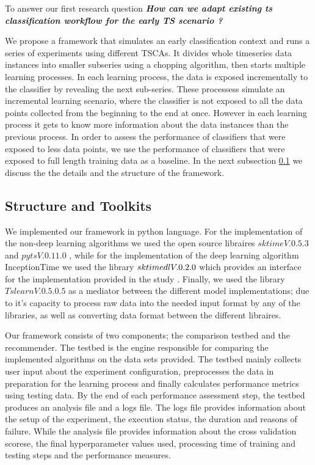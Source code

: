 To answer our first research question \textbf{\textit{How can we adapt existing ts classification workflow for the early TS scenario ?}}

We propose a framework that simulates an early classification context and runs a series of experiments using different TSCAs.
It divides whole timeseries data instances into smaller subseries using a chopping algorithm, then starts multiple learning processes.
In each learning process, the data is exposed incrementally to the classifier by revealing the next sub-series.
These processess simulate an incremental learning scenario, where the classifier is not exposed to all the data points collected from the beginning to the end at once.
However in each learning process it gets to know more information about the data instances than the previous process.
In order to assess the performance of classifiers that were exposed to less data points, we use the performance of classifiers that were exposed to full length training data as a baseline.
In the next subsection \ref{SubsectionFrameworkStructureToolkits} we discuss the the details and the structure of the framework.


\subsection{Structure and Toolkits}
\label{SubsectionFrameworkStructureToolkits}
We implemented our framework in python language.
For the implementation of the non-deep learning algorithms we used the open source libraires $sktime V. 0.5.3$ \cite{loning2019sktime} and $pyts V. 0.11.0$ \cite{JMLR:v21:19-763},
while for the implementation of the deep learning algorithm InceptionTime we used the library $sktime\-dl V .0.2.0$ which provides an interface for the implementation provided
in the study \cite{fawaz2020inceptiontime}. Finally, we used the library $Tslearn V. 0.5.0.5$ \cite{JMLR:v21:20-091} as a mediator between the different model implementations; due to it's
capacity to process raw data into the needed input format by any of the libraries, as well as converting data format between the different libraires.

Our framework consists of two components; the comparison testbed and the recommender.
The testbed is the engine responsible for comparing the implemented algorithms on the data sets provided.
The testbed mainly collects user input about the experiment configuration, preprocesses the data in preparation for the learning process
and finally calculates performance metrics using testing data.
By the end of each performance assessment step, the testbed produces an analysis file and a logs file.
The logs file provides information about the setup of the experiment, the execution status, the duration and reasons of failure.
While the analysis file provides information about the cross validation scorese, the final hyperparameter values used, processing time of training and testing steps and the performance measures.

